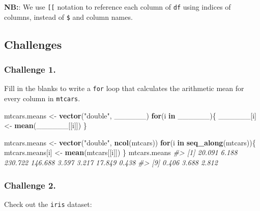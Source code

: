 \documentclass[]{book}
\newenvironment{Shaded}{\begin{snugshade}}{\end{snugshade}}
\newcommand{\KeywordTok}[1]{\textcolor[rgb]{0.13,0.29,0.53}{\textbf{#1}}}
\newcommand{\StringTok}[1]{\textcolor[rgb]{0.31,0.60,0.02}{#1}}
\newcommand{\CommentTok}[1]{\textcolor[rgb]{0.56,0.35,0.01}{\textit{#1}}}
\newcommand{\ControlFlowTok}[1]{\textcolor[rgb]{0.13,0.29,0.53}{\textbf{#1}}}
\newcommand{\NormalTok}[1]{#1}
\begin{document}
\textbf{NB:}: We use \texttt{{[}{[}} notation to reference each column
of \texttt{df} using indices of columns, instead of \texttt{\$} and
column names.

\subsection{Challenges}\label{challenges-16}

\subsubsection*{Challenge 1.}\label{challenge-1.-4}

Fill in the blanks to write a \texttt{for} loop that calculates the
arithmetic mean for every column in \texttt{mtcars}.

\begin{Shaded}
\begin{Highlighting}[]
\NormalTok{mtcars.means <-}\StringTok{ }\KeywordTok{vector}\NormalTok{(}\StringTok{"double"}\NormalTok{, ______)}
\ControlFlowTok{for}\NormalTok{(i }\ControlFlowTok{in}\NormalTok{ ______)\{}
\NormalTok{  ______[i] <-}\StringTok{ }\KeywordTok{mean}\NormalTok{(______[[i]])}
\NormalTok{\}}
\end{Highlighting}
\end{Shaded}

\begin{Shaded}
\begin{Highlighting}[]
\NormalTok{mtcars.means <-}\StringTok{ }\KeywordTok{vector}\NormalTok{(}\StringTok{"double"}\NormalTok{, }\KeywordTok{ncol}\NormalTok{(mtcars))}
\ControlFlowTok{for}\NormalTok{(i }\ControlFlowTok{in} \KeywordTok{seq_along}\NormalTok{(mtcars))\{}
\NormalTok{  mtcars.means[i] <-}\StringTok{ }\KeywordTok{mean}\NormalTok{(mtcars[[i]])}
\NormalTok{\}}
\NormalTok{mtcars.means}
\CommentTok{#>  [1]  20.091   6.188 230.722 146.688   3.597   3.217  17.849   0.438}
\CommentTok{#>  [9]   0.406   3.688   2.812}
\end{Highlighting}
\end{Shaded}

\subsubsection*{Challenge 2.}\label{challenge-2.-4}

Check out the \texttt{iris} dataset:
\end{document}
